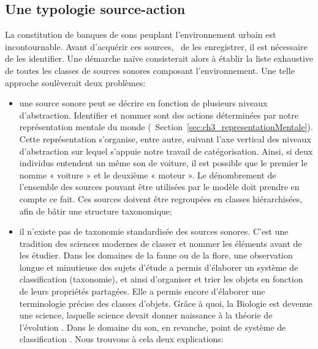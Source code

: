 \subsection{Une typologie source-action}
\label{sec:ch4_sourceAction}

La constitution de banques de sons peuplant l'environnement urbain est incontournable. Avant d'acquérir ces sources, \ie~de les enregistrer, il est nécessaire de les identifier. Une démarche naïve consisterait alors à établir la liste exhaustive de toutes les classes de sources sonores composant l'environnement. Une telle approche soulèverait deux problèmes:

\begin{itemize}
\item une source sonore peut se décrire en fonction de plusieurs niveaux d'abstraction. Identifier et nommer sont des actions déterminées par notre représentation mentale du monde (\cf~Section~\ref{sec:ch3_representationMentale}). Cette représentation s'organise, entre autre, suivant l'axe vertical des niveaux d'abstraction sur lequel s'appuie notre travail de catégorisation. Ainsi, si deux individus entendent un même son de voiture, il est possible que le premier le nomme « voiture » et le deuxième « moteur ». Le dénombrement de l'ensemble des sources pouvant être utilisées par le modèle doit prendre en compte ce fait. Ces sources doivent être regroupées en classes hiérarchisées, afin de bâtir une structure taxonomique;
\item il n'existe pas de taxonomie standardisée des sources sonores. C'est une tradition des sciences modernes de classer et nommer les éléments avant de les étudier. Dans les domaines de la faune ou de la flore, une observation longue et minutieuse des sujets d'étude a permis d'élaborer un système de classification (taxonomie), et ainsi d'organiser et trier les objets en fonction de leurs propriétés partagées. Elle a permis encore d'élaborer une terminologie précise des classes d'objets. Grâce à quoi, la Biologie est devenue une science, laquelle science devait donner naissance à la théorie de l'évolution \citep{lecointre2006tree}. Dans le domaine du son, en revanche, point de système de classification \citep{dubois2000categories,niessen2010categories}. Nous trouvons à cela deux explications:


\end{itemize}
